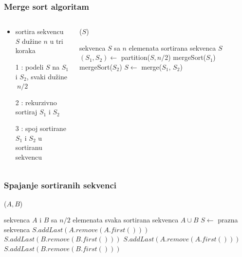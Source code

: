 \documentclass[compress,aspectratio=169]{beamer}
\begin{document}
\begin{frame}[fragile]
  \frametitle{Merge sort algoritam}
  \begin{columns}
    \begin{column}[t]{6cm}
      \begin{itemize}
        \item sortira sekvencu $S$ dužine $n$ u tri koraka
        \item[1] : podeli $S$ na $S_1$ i $S_2$, svaki dužine $~n/2$
        \item[2] : rekurzivno sortiraj $S_1$ i $S_2$
        \item[3] : spoj sortirane $S_1$ i $S_2$ u sortiranu sekvencu
      \end{itemize}    
    \end{column}
    \begin{column}[t]{6cm}
      ($S$)
      \begin{algorithmic}
      \REQUIRE sekvenca $S$ sa $n$ elemenata
      \ENSURE sortirana sekvenca $S$
        \STATE $(S_1, S_2) \leftarrow$ partition($S, n/2$)
        \STATE mergeSort($S_1$)
        \STATE mergeSort($S_2$)
        \STATE $S \leftarrow$ merge($S_1$, $S_2$)
      \ENDIF
      \end{algorithmic}    
    \end{column}
  \end{columns}
\end{frame}

\begin{frame}
  \frametitle{Spajanje sortiranih sekvenci}
  ($A, B$)
  \begin{algorithmic}
    \REQUIRE sekvenca $A$ i $B$ sa $n/2$ elemenata svaka
    \ENSURE sortirana sekvenca $A\cup B$
    \STATE $S \leftarrow$ prazna sekvenca
        \STATE $S.addLast(A.remove(A.first()))$
      \ELSE
        \STATE $S.addLast(B.remove(B.first()))$
      \ENDIF
    \ENDWHILE
      \STATE $S.addLast(A.remove(A.first()))$
    \ENDWHILE
      \STATE $S.addLast(B.remove(B.first()))$
    \ENDWHILE
  \end{algorithmic}    
\end{frame}
\end{document}
